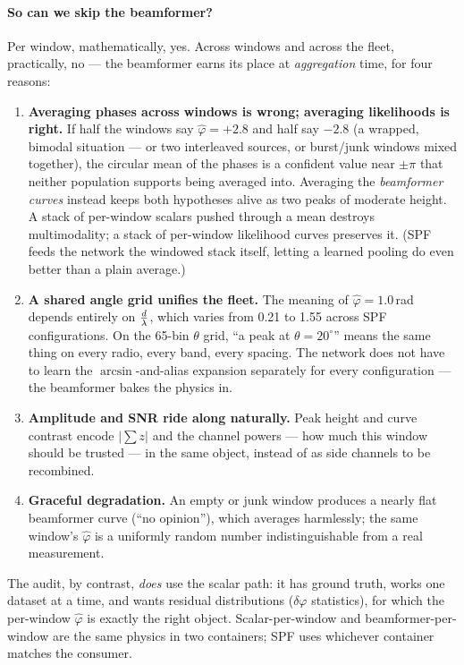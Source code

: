 \paragraph{So can we skip the beamformer?}
Per window, mathematically, yes. Across windows and across the fleet,
practically, no --- the beamformer earns its place at \emph{aggregation}
time, for four reasons:
\begin{enumerate}
  \item \textbf{Averaging phases across windows is wrong; averaging
        likelihoods is right.} If half the windows say $\hat\varphi = +2.8$
        and half say $-2.8$ (a wrapped, bimodal situation --- or two
        interleaved sources, or burst/junk windows mixed together), the
        circular mean of the phases is a confident value near $\pm\pi$ that
        neither population supports being averaged into. Averaging the
        \emph{beamformer curves} instead keeps both hypotheses alive as two
        peaks of moderate height. A stack of per-window scalars pushed
        through a mean destroys multimodality; a stack of per-window
        likelihood curves preserves it. (SPF feeds the network the windowed
        stack itself, letting a learned pooling do even better than a plain
        average.)
  \item \textbf{A shared angle grid unifies the fleet.} The meaning of
        $\hat\varphi = 1.0$\,rad depends entirely on $\tfrac{d}{\lambda}$, which varies
        from 0.21 to 1.55 across SPF configurations. On the 65-bin $\theta$
        grid, ``a peak at $\theta = 20^\circ$'' means the same thing on every
        radio, every band, every spacing. The network does not have to learn
        the $\arcsin$-and-alias expansion separately for every configuration
        --- the beamformer bakes the physics in.
  \item \textbf{Amplitude and SNR ride along naturally.} Peak height and
        curve contrast encode $|\sum z|$ and the channel powers --- how much
        this window should be trusted --- in the same object, instead of as
        side channels to be recombined.
  \item \textbf{Graceful degradation.} An empty or junk window produces a
        nearly flat beamformer curve (``no opinion''), which averages
        harmlessly; the same window's $\hat\varphi$ is a uniformly random
        number indistinguishable from a real measurement.
\end{enumerate}
The audit, by contrast, \emph{does} use the scalar path: it has ground truth,
works one dataset at a time, and wants residual distributions
($\delta\varphi$ statistics), for which the per-window $\hat\varphi$ is
exactly the right object. Scalar-per-window and beamformer-per-window are the
same physics in two containers; SPF uses whichever container matches the
consumer.


